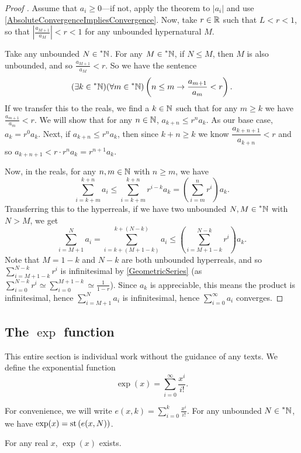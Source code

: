 \begin{proof}[Proof ]
    Assume that $a_i \geq 0$---if not, apply the theorem to $|a_i|$ and use \autoref{AbsoluteConvergenceImpliesConvergence}. Now, take $r \in \mathbb{R}$ such that $L < r < 1$, so that $\left|\frac{a_{M+1}}{a_M}\right| < r < 1$ for any unbounded hypernatural $M$.

    Take any unbounded $N \in \prescript{*}{}{\mathbb{N}}$. For any $M \in \prescript{*}{}{\mathbb{N}}$, if $N \leq M$, then $M$ is also unbounded, and so $\frac{a_{M+1}}{a_M} < r$. So we have the sentence
    \[ 
    (\exists k \in \prescript{*}{}{\mathbb{N}})(\forall m \in \prescript{*}{}{\mathbb{N}})\left(n \leq m \to \frac{a_{m+1}}{a_m} < r\right). 
    \]
    If we transfer this to the reals, we find a $k \in \mathbb{N}$ such that for any $m \geq k$ we have $\frac{a_{m+1}}{a_m} < r$. We will show that for any $n \in \mathbb{N}$, $a_{k+n} \leq r^n a_k$. As our base case, $a_k = r^0 a_k$. Next, if $a_{k+n} \leq r^n a_k$, then since $k+n \geq k$ we know $\dfrac{a_{k+n+1}}{a_{k+n}} < r$ and so $a_{k+n+1} < r \cdot r^n a_k = r^{n+1}a_k$.

    Now, in the reals, for any $n, m \in \mathbb{N}$ with $n \geq m$, we have 
    \[ 
    \sum_{i=k+m}^{k+n} a_i \leq \sum_{i=k+m}^{k+n} r^{i-k} a_k = \left(\sum_{i=m}^n r^i\right) a_k. 
    \]
    Transferring this to the hyperreals, if we have two unbounded $N, M \in \prescript{*}{}{\mathbb{N}}$ with $N > M$, we get
    \[ 
    \sum_{i=M+1}^N a_i = \sum_{i=k+(M+1-k)}^{k+(N-k)} a_i \leq \left(\sum_{i=M+1-k}^{N-k} r^i \right) a_k. 
    \]
    Note that $M=1-k$ and $N-k$ are both unbounded hyperreals, and so $\sum_{i=M+1-k}^{N-k} r^i$ is infinitesimal by \autoref{GeometricSeries} (as $\sum_{i=0}^{N-k} r^i \simeq \sum_{i=0}^{M+1-k} \simeq \frac{1}{1-r}$). Since $a_k$ is appreciable, this means the product is infinitesimal, hence $\sum_{i=M+1}^N a_i$ is infinitesimal, hence $\sum_{i=0}^\infty a_i$ converges.
\end{proof}

\subsection{The \texorpdfstring{$\exp$}{exp} function}
This entire section is individual work without the guidance of any texts. We define the exponential function \[\exp(x) = \sum_{i=0}^\infty \frac{x^i}{i!}.\]

For convenience, we will write $e(x, k) = \sum_{i=0}^k \frac{x^i}{i!}$. For any unbounded $N \in \prescript{*}{}{\mathbb{N}}$, we have $\exp(x) = \operatorname{st}\left(e(x, N)\right)$.

\begin{thm}\label{expExists}
    For any real $x$, $\exp(x)$ exists.
\end{thm}

